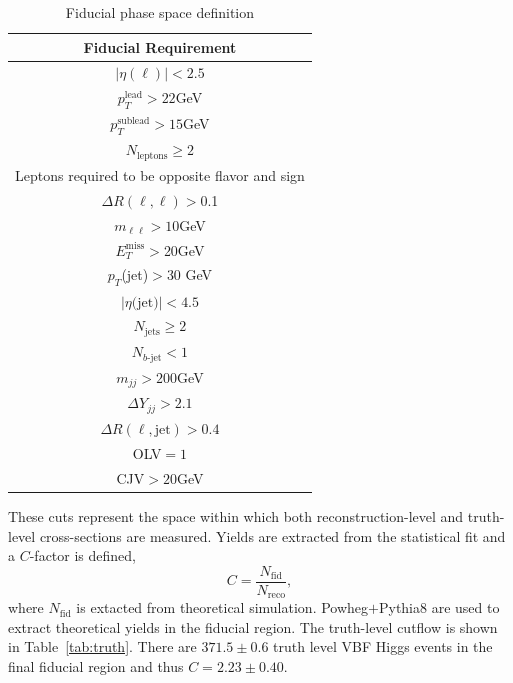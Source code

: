 \begin{table}[!ht]
\centering
\begin{tabular}{|c|}
\hline
Fiducial Requirement \\
\hline
$|\eta(\ell)|<2.5$ \\
$p_T^{\text{lead}}>22$GeV \\
$p_T^{\text{sublead}}>15$GeV \\
$N_{\text{leptons}}\geq2$ \\
Leptons required to be opposite flavor and sign \\
$\Delta R(\ell,\ell) >$0.1 \\
$m_{\ell\ell}>10$GeV \\
$E_T^{\text{miss}}>$20GeV \\
$p_T$(jet)$>$30 GeV \\
$|\eta\text{(jet)}|<4.5$ \\ 
$N_{\text{jets}} \geq 2$ \\
$N_{b\text{-jet}} < 1$ \\
$m_{jj} >200$GeV \\
$\Delta Y_{jj}>2.1$ \\
$\Delta R(\ell,\text{jet})>0.4$ \\
OLV$=1$ \\
CJV$>20$GeV \\
\hline
\end{tabular}
\caption{Fiducial phase space definition}
\label{tab:fiducial}
\end{table}
These cuts represent the space within which both reconstruction-level and truth-level cross-sections are measured. Yields are extracted from the statistical fit and a $C$-factor is defined, 
\begin{equation}
C = \frac{N_\text{fid}}{N_{\text{reco}}},
\end{equation}
where $N_\text{fid}$ is extacted from theoretical simulation. Powheg$+$Pythia8 are used to extract theoretical yields in the fiducial region. The truth-level cutflow is shown in Table~\ref{tab:truth}. There are $371.5\pm0.6$ truth level VBF Higgs events in the final fiducial region and thus $C=2.23\pm 0.40$. 

